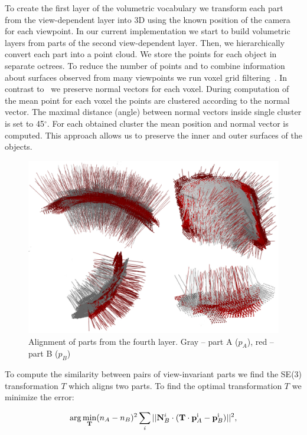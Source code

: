 \documentclass[letterpaper,10pt,conference]{ieeeconf}  %
\begin{document}
To create the first layer of the volumetric vocabulary we transform each part from the view-dependent layer into 3D using the known position of the camera for each viewpoint. In our current implementation we start to build volumetric layers from parts of the second view-dependent layer. Then, we hierarchically convert each part into a point cloud. We store the points for each object in separate octrees. To reduce the number of points and to combine information about surfaces observed from many viewpoints we run voxel grid filtering~\cite{Aldoma2012}. In contrast to~\cite{Aldoma2012} we preserve normal vectors for each voxel. During computation of the mean point for each voxel the points are clustered according to the normal vector. The maximal distance (angle) between normal vectors inside single cluster is set to 45$^\circ$. For each obtained cluster the mean position and normal vector is computed. This approach allows us to preserve the inner and outer surfaces of the objects.

\begin{figure}[t]
 \centering
\includegraphics[width=0.95\columnwidth]{../images/viParts.eps}
\caption{Alignment of parts from the fourth layer. Gray -- part A ($p_A$), red -- part B ($p_B$)}
 \label{viParts}
\end{figure}

To compute the similarity between pairs of view-invariant parts we find the SE(3) transformation $T$ which aligns two parts. To find the optimal transformation $T$ we minimize the error:

\begin{equation}
\label{optVol}
 \arg\min_{\bf T} (n_A-n_B)^2 \sum_i ||{\bf N}_B^i \cdot ({\bf T}\cdot {\bf p}_A^{\rm i}-{\bf p}_B^{\rm i})||^2,
\end{equation}
\end{document}
